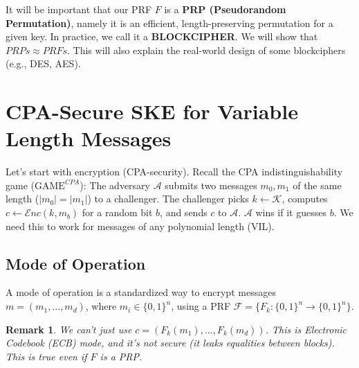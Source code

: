 \documentclass[11pt, a4paper]{article}
\newcommand{\enc}{\mathcal{E}nc}
\newcommand{\game}{\text{GAME}}
\newtheorem{rem}{Remark}
\begin{document}
It will be important that our PRF $F$ is a \textbf{PRP (Pseudorandom Permutation)}, namely it is an efficient, length-preserving permutation for a given key. 
In practice, we call it a \textbf{BLOCKCIPHER}. We will show that $PRPs \approx PRFs$. 
This will also explain the real-world design of some blockciphers (e.g., DES, AES). 

\section*{CPA-Secure SKE for Variable Length Messages}
Let's start with encryption (CPA-security). 
Recall the CPA indistinguishability game ($\game^{CPA}$): 
The adversary $\mathcal{A}$ submits two messages $m_0, m_1$ of the same length ($|m_0| = |m_1|$) to a challenger. The challenger picks $k \leftarrow \mathcal{K}$, computes $c \leftarrow \enc(k, m_b)$ for a random bit $b$, and sends $c$ to $\mathcal{A}$. $\mathcal{A}$ wins if it guesses $b$.
We need this to work for messages of any polynomial length (VIL). 

\subsection*{Mode of Operation} 
A mode of operation is a standardized way to encrypt messages $m = (m_1, \dots, m_d)$, where $m_i \in \{0,1\}^n$, using a PRF $\mathcal{F} = \{F_k: \{0,1\}^n \rightarrow \{0,1\}^n\}$. 

\begin{rem}
We can't just use $c = (F_k(m_1), \dots, F_k(m_d))$. This is Electronic Codebook (ECB) mode, and it's not secure (it leaks equalities between blocks). This is true even if $F$ is a PRP. 
\end{rem}
\end{document}
